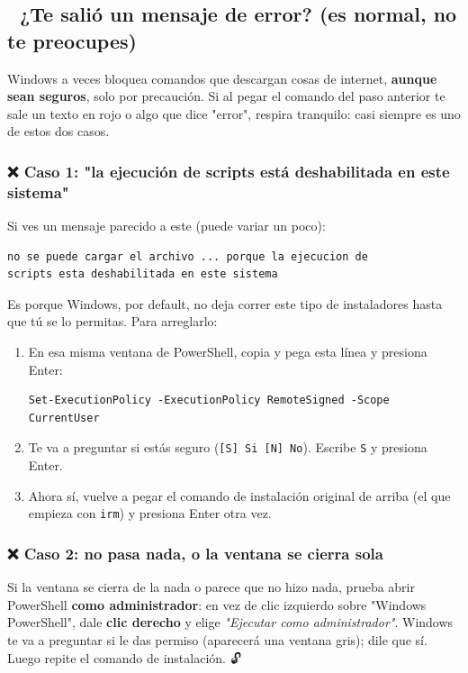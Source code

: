\documentclass[12pt]{article}
\begin{document}
\subsection{🚧 ¿Te salió un mensaje de error? (es normal, no te preocupes)}
Windows a veces bloquea comandos que descargan cosas de internet, \textbf{aunque sean seguros}, solo por precaución. Si al pegar el comando del paso anterior te sale un texto en rojo o algo que dice "error", respira tranquilo: casi siempre es uno de estos dos casos. 🧯

\subsubsection{❌ Caso 1: "la ejecución de scripts está deshabilitada en este sistema"}
Si ves un mensaje parecido a este (puede variar un poco):
\begin{verbatim}
no se puede cargar el archivo ... porque la ejecucion de
scripts esta deshabilitada en este sistema
\end{verbatim}
Es porque Windows, por default, no deja correr este tipo de instaladores hasta que tú se lo permitas. Para arreglarlo:
\begin{enumerate}
    \item En esa misma ventana de PowerShell, copia y pega esta línea y presiona Enter:
\begin{verbatim}
Set-ExecutionPolicy -ExecutionPolicy RemoteSigned -Scope CurrentUser
\end{verbatim}
    \item Te va a preguntar si estás seguro (\texttt{[S] Si  [N] No}). Escribe \texttt{S} y presiona Enter.
    \item Ahora sí, vuelve a pegar el comando de instalación original de arriba (el que empieza con \texttt{irm}) y presiona Enter otra vez.
\end{enumerate}

\subsubsection{❌ Caso 2: no pasa nada, o la ventana se cierra sola}
Si la ventana se cierra de la nada o parece que no hizo nada, prueba abrir PowerShell \textbf{como administrador}: en vez de clic izquierdo sobre "Windows PowerShell", dale \textbf{clic derecho} y elige \textit{"Ejecutar como administrador"}. Windows te va a preguntar si le das permiso (aparecerá una ventana gris); dile que sí. Luego repite el comando de instalación. 🔓
\end{document}
